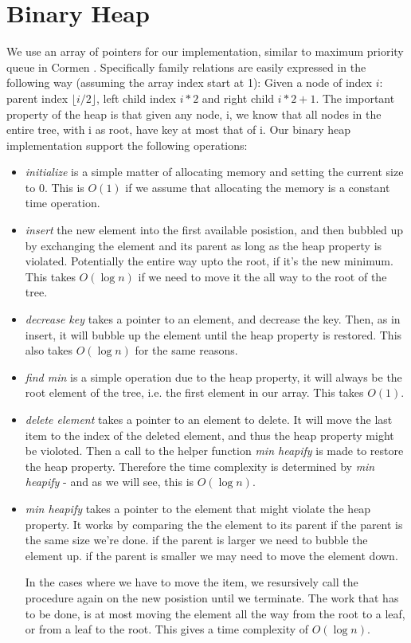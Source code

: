 \section*{Binary Heap}
We use an array of pointers for our implementation, similar to maximum priority queue in Cormen \cite{cormen}. Specifically family relations are easily expressed in the following way (assuming the array index start at 1): Given a node of index $i$: parent index $\lfloor i/2 \rfloor$, left child index $i*2$ and right child $i*2+1$. The important property of the heap is that given any node, i, we know that all nodes in the entire tree, with i as root, have key at most that of i. Our binary heap implementation support the following operations:
\begin{itemize}
 \item{\em{initialize}} is a simple matter of allocating memory and setting the current size to $0$. This is $O(1)$ if we assume that allocating the memory is a constant time operation.
 \item{\em{insert}} the new element into the first available posistion, and then bubbled up by exchanging the element and its parent as long as the heap property is violated. Potentially the entire way upto the root, if it's the new minimum. This takes $O(\log n)$ if we need to move it the all way to the root of the tree.
 \item{\em{decrease key}} takes a pointer to an element, and decrease the key. Then, as in insert, it will bubble up the element until the heap property is restored. This also takes $O(\log n)$ for the same reasons.
 \item{\em{find min}} is a simple operation due to the heap property, it will always be the root element of the tree, i.e. the first element in our array. This takes $O(1)$.
 \item{\em{delete element}} takes a pointer to an element to delete. It will move the last item to the index of the deleted element, and thus the heap property might be violoted. Then a call to the helper function \textit{min heapify} is made to restore the heap property. Therefore the time complexity is determined by \textit{min heapify} - and as we will see, this is $O(\log n)$.
 \item{\em{min heapify}} takes a pointer to the element that might violate the heap property. It works by comparing the the element to its parent
   \subitem if the parent is the same size we're done.
   \subitem if the parent is larger we need to bubble the element up.
   \subitem if the parent is smaller we may need to move the element down.

 In the cases where we have to move the item, we resursively call the procedure again on the new posistion until we terminate. The work that has to be done, is at most moving the element all the way from the root to a leaf, or from a leaf to the root. This gives a time complexity of $O(\log n)$.
\end{itemize}